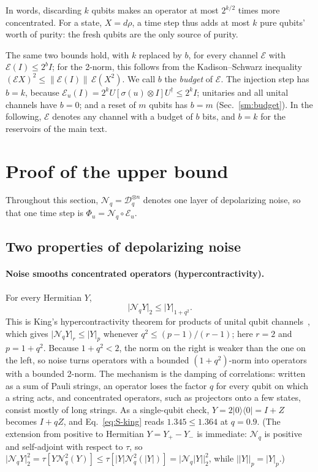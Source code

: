 \documentclass[aps,prl,twocolumn,superscriptaddress,floatfix]{revtex4-2}
\theoremstyle{plain}
\newcommand{\ketbra}[2]{|#1\rangle\!\langle #2|}
\newcommand{\nrm}[2]{\lvert #1\rvert_{#2}}
\newcommand{\Norm}[1]{\lVert #1\rVert}
\newcommand{\cD}{\mathcal D}
\newcommand{\cE}{\mathcal E}
\newcommand{\Nq}{\mathcal N_q}
\begin{document}
In words, discarding $k$ qubits makes an operator at most $2^{k/2}$ times more concentrated. For a state, $X=d\rho$, a time step thus adds at most $k$ pure qubits' worth of purity: the fresh qubits are the only source of purity.

The same two bounds hold, with $k$ replaced by $b$, for every channel $\cE$ with $\cE(I)\le2^bI$; for the 2-norm, this follows from the Kadison--Schwarz inequality $(\cE X)^2\le\Norm{\cE(I)}\,\cE(X^2)$. We call $b$ the \emph{budget} of $\cE$. The injection step has $b=k$, because $\cE_u(I)=2^kU[\sigma(u)\otimes I]U^\dagger\le2^kI$; unitaries and all unital channels have $b=0$; and a reset of $m$ qubits has $b=m$ (Sec.~\ref{sm:budget}). In the following, $\cE$ denotes any channel with a budget of $b$ bits, and $b=k$ for the reservoirs of the main text.

\section{Proof of the upper bound}
\label{sm:upper}

Throughout this section, $\Nq=\cD_q^{\otimes n}$ denotes one layer of depolarizing noise, so that one time step is $\Phi_u=\Nq\circ\cE_u$.

\subsection{Two properties of depolarizing noise}
\label{sm:ineq}

\paragraph*{Noise smooths concentrated operators (hypercontractivity).} For every Hermitian $Y$,
\begin{equation}
\nrm{\Nq Y}2\le\nrm Y{1+q^2} .
\label{eq:S-king}
\end{equation}
This is King's hypercontractivity theorem for products of unital qubit channels~\cite[Corollary~2]{King2014}, which gives $\nrm{\Nq Y}r\le\nrm Yp$ whenever $q^2\le(p-1)/(r-1)$; here $r=2$ and $p=1+q^2$. Because $1+q^2<2$, the norm on the right is weaker than the one on the left, so noise turns operators with a bounded $(1+q^2)$-norm into operators with a bounded 2-norm. The mechanism is the damping of correlations: written as a sum of Pauli strings, an operator loses the factor $q$ for every qubit on which a string acts, and concentrated operators, such as projectors onto a few states, consist mostly of long strings. As a single-qubit check, $Y=2\ketbra00=I+Z$ becomes $I+qZ$, and Eq.~\eqref{eq:S-king} reads $1.345\le1.364$ at $q=0.9$. (The extension from positive to Hermitian $Y=Y_+-Y_-$ is immediate: $\Nq$ is positive and self-adjoint with respect to $\tau$, so $\nrm{\Nq Y}2^2=\tau[Y\Nq^2(Y)]\le\tau[|Y|\Nq^2(|Y|)]=\nrm{\Nq|Y|}2^2$, while $\nrm{|Y|}p=\nrm Yp$.)
\end{document}
